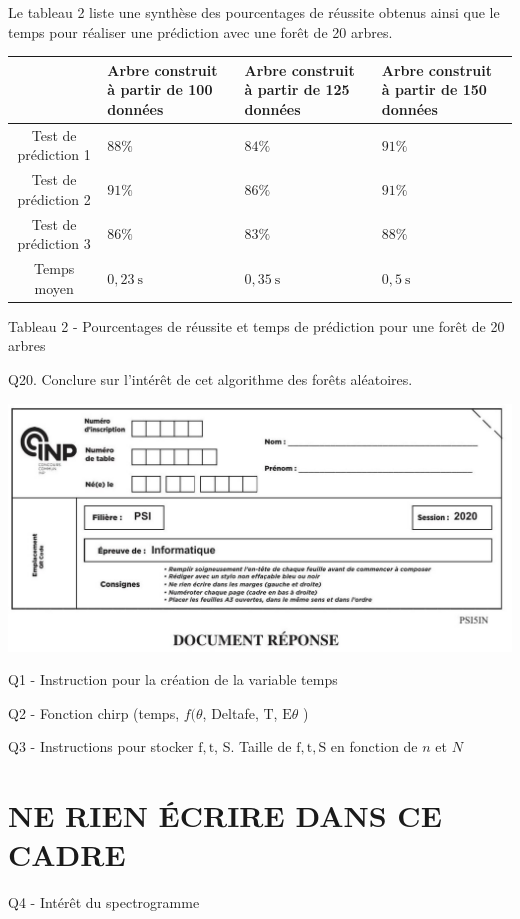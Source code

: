 \documentclass[10pt]{article}
\begin{document}
Le tableau 2 liste une synthèse des pourcentages de réussite obtenus ainsi que le temps pour réaliser une prédiction avec une forêt de 20 arbres.

\begin{tabular}{|c|l|l|l|}
\hline
 & Arbre construit à partir de 100 données & Arbre construit à partir de 125 données & Arbre construit à partir de 150 données \\
\hline
Test de prédiction 1 & $88 \%$ & $84 \%$ & $91 \%$ \\
\hline
Test de prédiction 2 & $91 \%$ & $86 \%$ & $91 \%$ \\
\hline
Test de prédiction 3 & $86 \%$ & $83 \%$ & $88 \%$ \\
\hline
Temps moyen & $0,23 \mathrm{~s}$ & $0,35 \mathrm{~s}$ & $0,5 \mathrm{~s}$ \\
\hline
\end{tabular}

Tableau 2 - Pourcentages de réussite et temps de prédiction pour une forêt de 20 arbres

Q20. Conclure sur l'intérêt de cet algorithme des forêts aléatoires.

\includegraphics[max width=\textwidth]{2022_02_02_1af495ea60fb42b668bfg-13}

Q1 - Instruction pour la création de la variable temps

Q2 - Fonction chirp (temps, $f(\theta$, Deltafe, $\mathrm{T}$, $\mathrm{E} \theta$ )

Q3 - Instructions pour stocker $\mathrm{f}, \mathrm{t}$, S. Taille de $\mathrm{f}, \mathrm{t}, \mathrm{S}$ en fonction de $n$ et $N$

\section{NE RIEN ÉCRIRE DANS CE CADRE}
Q4 - Intérêt du spectrogramme
\end{document}
